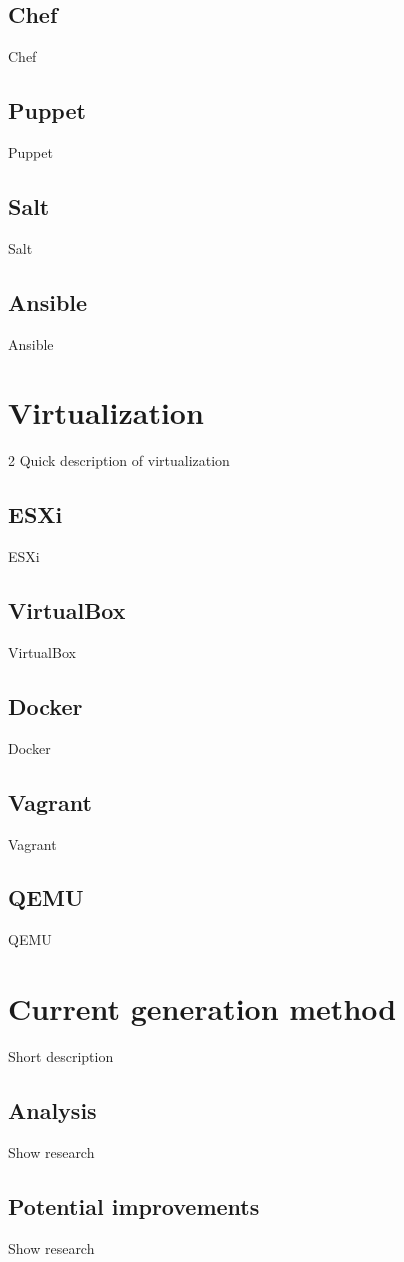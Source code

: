 \documentclass[12pt,a4paper]{report}
\begin{document}
\subsection{Chef}
Chef \citep{chef}
\subsection{Puppet}
Puppet \citep{puppet}
\subsection{Salt}
Salt \citep{salt}
\subsection{Ansible}
Ansible \citep{ansible}
\section{Virtualization}2
Quick description of virtualization
\subsection{ESXi}
ESXi \citep{esxi}
\subsection{VirtualBox}
VirtualBox \citep{virtualbox}
\subsection{Docker}
Docker \citep{docker}
\subsection{Vagrant}
Vagrant \citep{vagrant}
\subsection{QEMU}
QEMU \citep{qemu}
\section{Current generation method}
Short description
\subsection{Analysis}
Show research
\subsection{Potential improvements}
Show research
\end{document}
